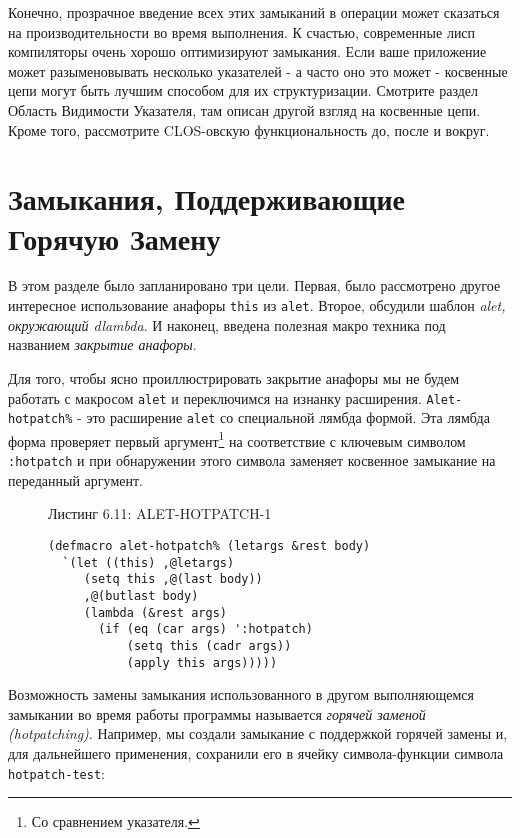 Конечно, прозрачное введение всех этих замыканий в операции может сказаться на производительности во время выполнения. К счастью, современные лисп компиляторы очень хорошо оптимизируют замыкания. Если ваше приложение может разыменовывать несколько указателей - а часто оно это может - косвенные цепи могут быть лучшим способом для их структуризации. Смотрите раздел Область Видимости Указателя, там описан другой взгляд на косвенные цепи. Кроме того, рассмотрите CLOS-овскую функциональность до, после и вокруг.

\section{Замыкания, Поддерживающие Горячую Замену}\label{section_hotpatching_closures}


В этом разделе было запланировано три цели. Первая, было рассмотрено другое интересное использование анафоры \verb"this" из \verb"alet". Второе, обсудили шаблон \emph{alet, окружающий dlambda}. И наконец, введена полезная макро техника под названием \emph{закрытие анафоры}.

Для того, чтобы ясно проиллюстрировать закрытие анафоры мы не будем работать с макросом \verb"alet" и переключимся на изнанку расширения. \verb"Alet-hotpatch%" - это расширение \verb"alet" со специальной лямбда формой. Эта лямбда форма проверяет первый аргумент\footnote{Со сравнением указателя.} на соответствие с ключевым символом \verb":hotpatch" и при обнаружении этого символа заменяет косвенное замыкание на переданный аргумент.



\begin{figure}Листинг 6.11: ALET-HOTPATCH-1\label{listing_6.11}
\listbegin
\begin{verbatim}
(defmacro alet-hotpatch% (letargs &rest body)
  `(let ((this) ,@letargs)
     (setq this ,@(last body))
     ,@(butlast body)
     (lambda (&rest args)
       (if (eq (car args) ':hotpatch)
           (setq this (cadr args))
           (apply this args)))))
\end{verbatim}
\listend
\end{figure}

Возможность замены замыкания использованного в другом выполняющемся замыкании во время работы программы называется \emph{горячей заменой (hotpatching)}. Например, мы создали замыкание с поддержкой горячей замены и, для дальнейшего применения, сохранили его в ячейку символа-функции символа \verb"hotpatch-test":

